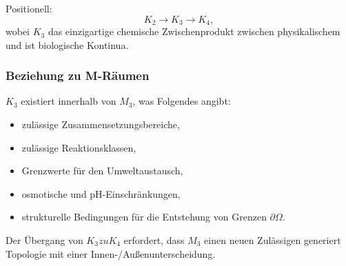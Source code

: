 Positionell:
\[
K_2 \to K_3 \to K_4,
\]
wobei $K_3$ das einzigartige chemische Zwischenprodukt zwischen physikalischem und ist
biologische Kontinua.

\subsubsection{Beziehung zu M-Räumen}

$K_3$ existiert innerhalb von $M_3$, was Folgendes angibt:
\begin{itemize}
    \item zulässige Zusammensetzungsbereiche,
    \item zulässige Reaktionsklassen,
    \item Grenzwerte für den Umweltaustausch,
    \item osmotische und pH-Einschränkungen,
    \item strukturelle Bedingungen für die Entstehung von Grenzen $\partial\Omega$.
\end{itemize}

Der Übergang von $K_3 zu K_4$ erfordert, dass $M_3$ einen neuen Zulässigen generiert
Topologie mit einer Innen-/Außenunterscheidung.
